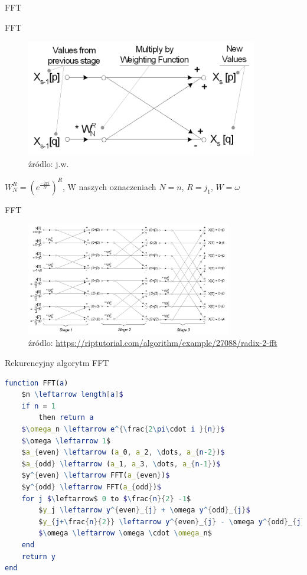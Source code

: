 \begin{frame}[allowframebreaks]{FFT}
\end{frame}  
\begin{frame}{FFT}
\begin{figure}
	    \centering
	   \includegraphics[width=0.9\textwidth]{img/16/bloczek_motyl.png}
	    \caption{źródlo: j.w.}
	    \label{fig:my_label}
	\end{figure}
    $W_{N}^R=(e^{\frac{-2\pi i}{N}})^R$, W naszych oznaczeniach $N=n$, $R=j_1$, $W=\omega$
\end{frame}
\begin{frame}{FFT}
    \begin{figure}
	    \centering
	   \includegraphics[width=0.8\textwidth]{img/16/motyl.png}
	    \caption{źródlo: \url{https://riptutorial.com/algorithm/example/27088/radix-2-fft}}
	    \label{fig:my_label}
	\end{figure}
\end{frame}
\begin{frame}[fragile]{Rekurencyjny algorytm FFT}
\begin{lstlisting}[language=Mathematica, mathescape]
function FFT(a)
	$n \leftarrow length[a]$
	if n = 1 
		then return a
	$\omega_n \leftarrow e^{\frac{2\pi\cdot i }{n}}$
	$\omega \leftarrow 1$
	$a_{even} \leftarrow (a_0, a_2, \dots, a_{n-2})$
	$a_{odd} \leftarrow (a_1, a_3, \dots, a_{n-1})$
	$y^{even} \leftarrow FFT(a_{even})$
	$y^{odd} \leftarrow FFT(a_{odd})$
	for j $\leftarrow$ 0 to $\frac{n}{2} -1$
		$y_j \leftarrow y^{even}_{j} + \omega y^{odd}_{j}$
		$y_{j+\frac{n}{2}} \leftarrow y^{even}_{j} - \omega y^{odd}_{j} $
		$\omega \leftarrow \omega \cdot \omega_n$
	end	
	return y
end
\end{lstlisting}

\end{frame}